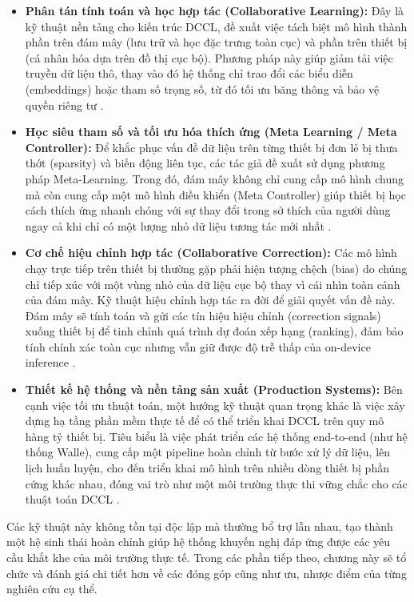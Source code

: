 \begin{itemize}
    \item \textbf{Phân tán tính toán và học hợp tác (Collaborative Learning):} Đây là kỹ thuật nền tảng cho kiến trúc DCCL, đề xuất việc tách biệt mô hình thành phần trên đám mây (lưu trữ và học đặc trưng toàn cục) và phần trên thiết bị (cá nhân hóa dựa trên đồ thị cục bộ). Phương pháp này giúp giảm tải việc truyền dữ liệu thô, thay vào đó hệ thống chỉ trao đổi các biểu diễn (embeddings) hoặc tham số trọng số, từ đó tối ưu băng thông và bảo vệ quyền riêng tư \cite{yao2021device}.
    
    \item \textbf{Học siêu tham số và tối ưu hóa thích ứng (Meta Learning / Meta Controller):} Để khắc phục vấn đề dữ liệu trên từng thiết bị đơn lẻ bị thưa thớt (sparsity) và biến động liên tục, các tác giả đề xuất sử dụng phương pháp Meta-Learning. Trong đó, đám mây không chỉ cung cấp mô hình chung mà còn cung cấp một mô hình điều khiển (Meta Controller) giúp thiết bị học cách thích ứng nhanh chóng với sự thay đổi trong sở thích của người dùng ngay cả khi chỉ có một lượng nhỏ dữ liệu tương tác mới nhất \cite{yao2022meta}.
    
    \item \textbf{Cơ chế hiệu chỉnh hợp tác (Collaborative Correction):} Các mô hình chạy trực tiếp trên thiết bị thường gặp phải hiện tượng chệch (bias) do chúng chỉ tiếp xúc với một vùng nhỏ của dữ liệu cục bộ thay vì cái nhìn toàn cảnh của đám mây. Kỹ thuật hiệu chỉnh hợp tác ra đời để giải quyết vấn đề này. Đám mây sẽ tính toán và gửi các tín hiệu hiệu chỉnh (correction signals) xuống thiết bị để tinh chỉnh quá trình dự đoán xếp hạng (ranking), đảm bảo tính chính xác toàn cục nhưng vẫn giữ được độ trễ thấp của on-device inference \cite{wang2025correction}.
    
    \item \textbf{Thiết kế hệ thống và nền tảng sản xuất (Production Systems):} Bên cạnh việc tối ưu thuật toán, một hướng kỹ thuật quan trọng khác là việc xây dựng hạ tầng phần mềm thực tế để có thể triển khai DCCL trên quy mô hàng tỷ thiết bị. Tiêu biểu là việc phát triển các hệ thống end-to-end (như hệ thống Walle), cung cấp một pipeline hoàn chỉnh từ bước xử lý dữ liệu, lên lịch huấn luyện, cho đến triển khai mô hình trên nhiều dòng thiết bị phần cứng khác nhau, đóng vai trò như một môi trường thực thi vững chắc cho các thuật toán DCCL \cite{cheng2022walle}.
\end{itemize}

Các kỹ thuật này không tồn tại độc lập mà thường bổ trợ lẫn nhau, tạo thành một hệ sinh thái hoàn chỉnh giúp hệ thống khuyến nghị đáp ứng được các yêu cầu khắt khe của môi trường thực tế. Trong các phần tiếp theo, chương này sẽ tổ chức và đánh giá chi tiết hơn về các đóng góp cũng như ưu, nhược điểm của từng nghiên cứu cụ thể.

